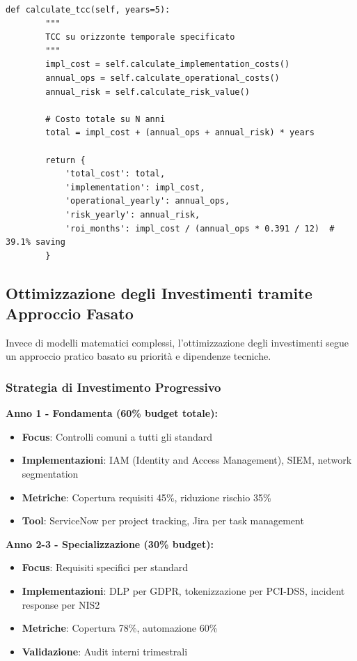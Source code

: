 \begin{lstlisting}[caption={Dashboard Python per Calcolo TCC},label={lst:tcc_dashboard}]
    def calculate_tcc(self, years=5):
        """
        TCC su orizzonte temporale specificato
        """
        impl_cost = self.calculate_implementation_costs()
        annual_ops = self.calculate_operational_costs()
        annual_risk = self.calculate_risk_value()
        
        # Costo totale su N anni
        total = impl_cost + (annual_ops + annual_risk) * years
        
        return {
            'total_cost': total,
            'implementation': impl_cost,
            'operational_yearly': annual_ops,
            'risk_yearly': annual_risk,
            'roi_months': impl_cost / (annual_ops * 0.391 / 12)  # 39.1% saving
        }
\end{lstlisting}

\subsection{Ottimizzazione degli Investimenti tramite Approccio Fasato}

Invece di modelli matematici complessi, l'ottimizzazione degli investimenti segue un approccio pratico basato su priorità e dipendenze tecniche\autocite{Bertsekas2017}.

\subsubsection{Strategia di Investimento Progressivo}

\textbf{Anno 1 - Fondamenta (60\% budget totale):}
\begin{itemize}
    \item \textbf{Focus}: Controlli comuni a tutti gli standard
    \item \textbf{Implementazioni}: IAM (Identity and Access Management), SIEM, network segmentation
    \item \textbf{Metriche}: Copertura requisiti 45\%, riduzione rischio 35\%
    \item \textbf{Tool}: ServiceNow per project tracking, Jira per task management
\end{itemize}

\textbf{Anno 2-3 - Specializzazione (30\% budget):}
\begin{itemize}
    \item \textbf{Focus}: Requisiti specifici per standard
    \item \textbf{Implementazioni}: DLP per GDPR, tokenizzazione per PCI-DSS, incident response per NIS2
    \item \textbf{Metriche}: Copertura 78\%, automazione 60\%
    \item \textbf{Validazione}: Audit interni trimestrali
\end{itemize}

